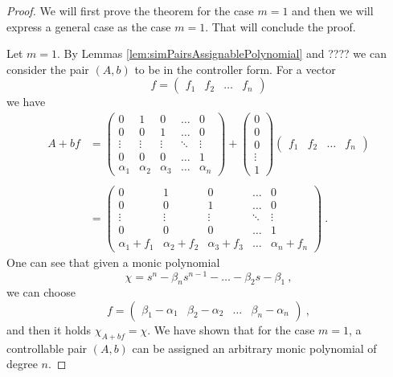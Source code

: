 \begin{proof}
    We will first prove the theorem for the case $m=1$ and then we will express a general case as the case $m=1$. That will conclude the proof.

    Let $m=1$. By Lemmas \ref{lem:simPairsAssignablePolynomial} and ???? we can consider the pair $(A,b)$ to be in the controller form. For a vector 
    \begin{equation*}
        f=\begin{pmatrix}
            f_1&f_2&\ldots&f_n
        \end{pmatrix}
    \end{equation*}
    we have 
    \begin{align*}
        A+bf&=
        \begin{pmatrix}
			0 & 1 & 0 & \ldots & 0 \\
			0 & 0 & 1 & \ldots & 0 \\
			\vdots & \vdots & \vdots & \ddots & \vdots \\
			0 & 0 & 0 & \ldots & 1 \\
			\alpha_1 & \alpha_2 & \alpha_3 & \ldots & \alpha_n
        \end{pmatrix}
        +
        \begin{pmatrix}
            0 \\
            0 \\
            0 \\
            \vdots \\
            1
        \end{pmatrix}
        \begin{pmatrix}
            f_1&f_2&\ldots&f_n
        \end{pmatrix}
        \\
        \\
        &=
        \begin{pmatrix}
			0 & 1 & 0 & \ldots & 0 \\
			0 & 0 & 1 & \ldots & 0 \\
			\vdots & \vdots & \vdots & \ddots & \vdots \\
			0 & 0 & 0 & \ldots & 1 \\
            \alpha_1+f_1 & \alpha_2+f_2 & \alpha_3+f_3 & \ldots & \alpha_n+f_n
        \end{pmatrix}\ .
    \end{align*}
    One can see that given a monic polynomial
    $$\chi=s^n-\beta_ns^{n-1}-\ldots-\beta_2s-\beta_1\ ,$$
    we can choose
    $$f=\begin{pmatrix}
        \beta_1-\alpha_1&\beta_2-\alpha_2&\ldots&\beta_n-\alpha_n
    \end{pmatrix}\ ,$$
    and then it holds $\chi_{A+bf}=\chi$. We have shown that for the case $m=1$, a controllable pair $(A,b)$ can be assigned an arbitrary monic polynomial of degree $n$.


\end{proof}
